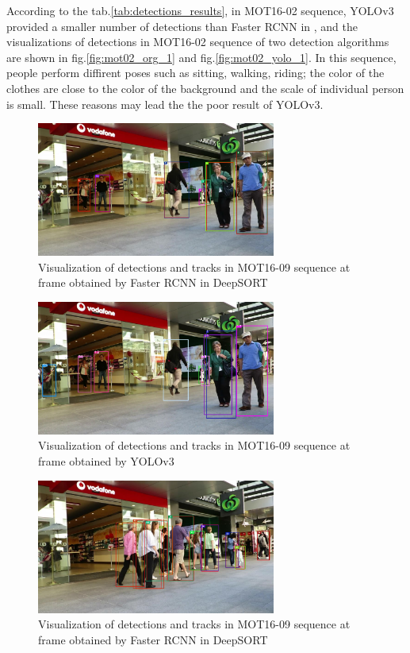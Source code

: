 According to the tab.\ref{tab:detections_results}, in MOT16-02 sequence, YOLOv3\cite{yolov3} provided a smaller number of detections than
Faster RCNN in \cite{Wojke2017simple}, and the visualizations of detections in MOT16-02 sequence of two detection algorithms are shown in
fig.\ref{fig:mot02_org_1} and fig.\ref{fig:mot02_yolo_1}. In this sequence, people perform diffirent poses such as
sitting, walking, riding; the color of the clothes are close to the color of the background and the scale of individual person is small.
These reasons may lead the the poor result of YOLOv3\cite{yolov3}.
\pagebreak
\begin{figure}[h!]
    \centering
    \includegraphics[width=0.7\textwidth]{Chapters/Fig/mot09_org_1.jpg}
    \caption{Visualization of detections and tracks in MOT16-09 sequence at frame obtained by Faster RCNN in DeepSORT\cite{Wojke2017simple}}
    \label{fig:mot09_org_1}
\end{figure}

\begin{figure}[h!]
    \centering
    \includegraphics[width=0.7\textwidth]{Chapters/Fig/mot09_yolo_1.jpg}
    \caption{Visualization of detections and tracks in MOT16-09 sequence at frame obtained by YOLOv3}
    \label{fig:mot09_yolo_1}
\end{figure}
\pagebreak
\begin{figure}[h!]
    \centering
    \includegraphics[width=0.7\textwidth]{Chapters/Fig/mot09_org_2.jpg}
    \caption{Visualization of detections and tracks in MOT16-09 sequence at frame obtained by Faster RCNN in DeepSORT\cite{Wojke2017simple}}
    \label{fig:mot09_org_2}
\end{figure}


